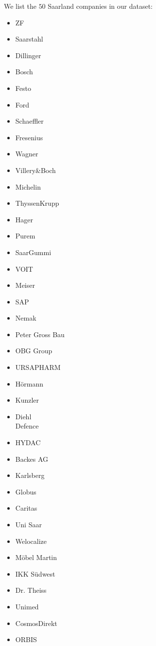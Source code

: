 \documentclass[12pt]{article}
\begin{document}
	We list the $50$ Saarland companies in our dataset:
	\begin{multicols}{4} \begin{itemize}
	   		\item ZF
	   		\item Saarstahl
	   		\item Dillinger
	   		\item Bosch
	   		\item Festo
	   		\item Ford
	   		\item Schaeffler
	   		\item Fresenius
	   		\item Wagner
	   		\item \footnotesize Villery\&Boch \normalsize
	   		\item Michelin
	   		\item \scriptsize ThyssenKrupp \normalsize
	   		\item Hager
	   		\item Purem
	   		\item \small SaarGummi \normalsize
	   		\item VOIT
	   		\item Meiser
	   		\item SAP
	   		\item Nemak
	   		\item Peter Gross Bau
	   		\item OBG Group
	   		\item \scriptsize URSAPHARM \normalsize
	   		\item Hörmann
	   		\item Kunzler
	   		\item Diehl \\Defence
	   		\item HYDAC
	   		\item Backes AG
	   		\item Karlsberg
	   		\item Globus
	   		\item Caritas
	   		\item Uni Saar
	   		\item Welocalize
	   		\item Möbel Martin
	   		\item IKK Südwest
	   		\item Dr. Theiss
	   		\item Unimed
	   		\item CosmosDirekt
	   		\item ORBIS

\end{itemize}
\end{multicols}
\end{document}

